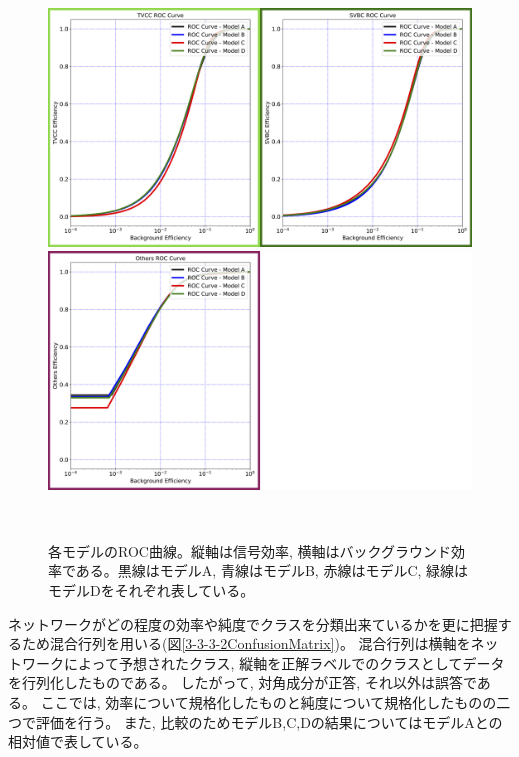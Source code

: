 \begin{figure}[htbp]
 \centering
   \begin{minipage}{1.0\textwidth}
   \centering
    \includegraphics[width=1.0\textwidth, clip]{Figure/3Networks/3-3-3-2ROC_Curve_3.png}
   \end{minipage}
   
   \begin{minipage}{1.0\textwidth}
   \centering
    \includegraphics[width=1.0\textwidth, clip]{Figure/3Networks/3-3-3-2ROC_Curve_4.png}
   \end{minipage}
  \caption[各モデルのROC曲線]{各モデルのROC曲線。縦軸は信号効率, 横軸はバックグラウンド効率である。黒線はモデルA, 青線はモデルB, 赤線はモデルC, 緑線はモデルDをそれぞれ表している。}
  \label{3-3-3-2ROC_Curve}
\end{figure}

ネットワークがどの程度の効率や純度でクラスを分類出来ているかを更に把握するため混合行列を用いる(図\ref{3-3-3-2ConfusionMatrix})。
混合行列は横軸をネットワークによって予想されたクラス, 縦軸を正解ラベルでのクラスとしてデータを行列化したものである。
したがって, 対角成分が正答, それ以外は誤答である。
ここでは, 効率について規格化したものと純度について規格化したものの二つで評価を行う。
また, 比較のためモデルB,C,Dの結果についてはモデルAとの相対値で表している。

